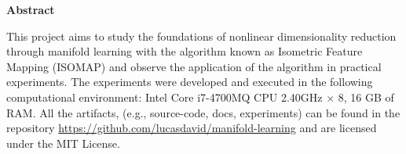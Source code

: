\begin{center}
	\textbf{Abstract}
\end{center}

This project aims to study the foundations of nonlinear dimensionality reduction through manifold learning with the algorithm known as Isometric Feature Mapping (ISOMAP) and observe the application of the algorithm in practical experiments. The experiments were developed and executed in the following computational environment: Intel Core i7-4700MQ CPU 2.40GHz $\times$ 8, 16 GB of RAM. All the artifacts, (e.g., source-code, docs, experiments) can be found in the repository \url{https://github.com/lucasdavid/manifold-learning} and are licensed under the MIT License.

\afterpage{\blankpage}
